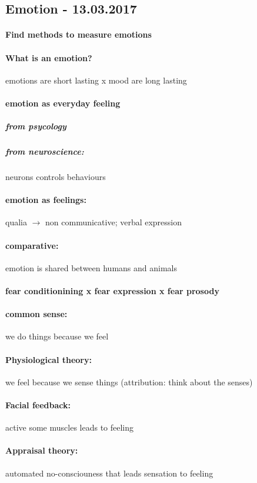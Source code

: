 \documentclass[12pt,article,oneside,a4paper]{memoir}
\begin{document}
\subsection{Emotion - 13.03.2017}
\paragraph{Find methods to measure emotions}
\paragraph{What is an emotion?} emotions are short lasting x mood are long lasting
\paragraph{emotion as everyday feeling}
\subparagraph{from psycology}
\subparagraph{from neuroscience:} neurons controls behaviours
\paragraph{emotion as feelings:} qualia $\rightarrow$ non communicative; verbal expression
\paragraph{comparative:} emotion is shared between humans and animals
\paragraph{fear conditionining x fear expression x fear prosody}

\paragraph{common sense:} we do things because we feel
\paragraph{Physiological theory:} we feel because we sense things (attribution: think about the senses)
\paragraph{Facial feedback:} active some muscles leads to feeling
\paragraph{Appraisal theory:} automated no-consciouness that leads sensation to feeling
\end{document}
